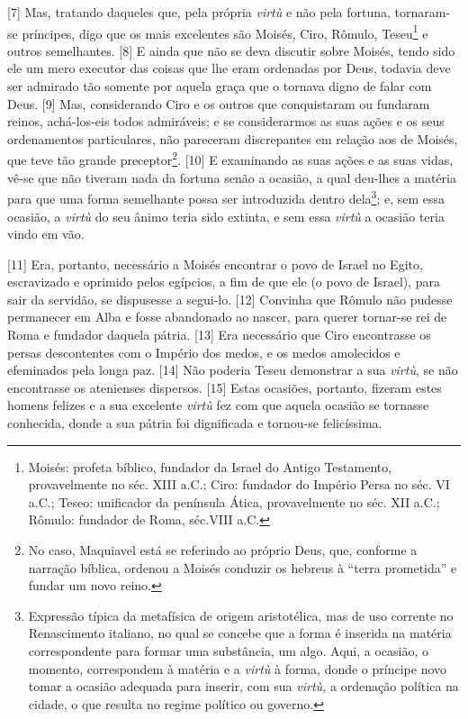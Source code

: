 {[}7{]} Mas, tratando daqueles que, pela própria \emph{virtù} e não pela
fortuna, tornaram- se príncipes, digo que os mais excelentes são Moisés,
Ciro, Rômulo, Teseu\footnote{Moisés: profeta bíblico, fundador da Israel
  do Antigo Testamento, provavelmente no séc. XIII a.C.; Ciro: fundador
  do Império Persa no séc. VI a.C.; Teseo: unificador da península
  Ática, provavelmente no séc. XII a.C.; Rômulo: fundador de Roma,
  séc.VIII a.C.} e outros semelhantes. {[}8{]} E ainda que não se deva
discutir sobre Moisés, tendo sido ele um mero executor das coisas que
lhe eram ordenadas por Deus, todavia deve ser admirado tão somente por
aquela graça que o tornava digno de falar com Deus. {[}9{]} Mas,
considerando Ciro e os outros que conquistaram ou fundaram reinos,
achá-los-eis todos admiráveis; e se considerarmos as suas ações e os
seus ordenamentos particulares, não pareceram discrepantes em relação
aos de Moisés, que teve tão grande preceptor\footnote{No caso, Maquiavel
  está se referindo ao próprio Deus, que, conforme a narração bíblica,
  ordenou a Moisés conduzir os hebreus à ``terra prometida'' e fundar um
  novo reino.}. {[}10{]} E examinando as suas ações e as suas vidas,
vê-se que não tiveram nada da fortuna senão a ocasião, a qual deu-lhes a
matéria para que uma forma semelhante possa ser introduzida dentro
dela\footnote{Expressão típica da metafísica de origem aristotélica, mas
  de uso corrente no Renascimento italiano, no qual se concebe que a
  forma é inserida na matéria correspondente para formar uma substância,
  um algo. Aqui, a ocasião, o momento, correspondem à matéria e a
  \emph{virtù} à forma, donde o príncipe novo tomar a ocasião adequada
  para inserir, com sua \emph{virtù,} a ordenação política na cidade, o
  que resulta no regime político ou governo.}; e, sem essa ocasião, a
\emph{virtù} do seu ânimo teria sido extinta, e sem essa \emph{virtù} a
ocasião teria vindo em vão.

{[}11{]} Era, portanto, necessário a Moisés encontrar o povo de Israel
no Egito, escravizado e oprimido pelos egípcios, a fim de que ele (o
povo de Israel), para sair da servidão, se dispusesse a segui-lo.
{[}12{]} Convinha que Rômulo não pudesse permanecer em Alba e fosse
abandonado ao nascer, para querer tornar-se rei de Roma e fundador
daquela pátria. {[}13{]} Era necessário que Ciro encontrasse os persas
descontentes com o Império dos medos, e os medos amolecidos e efeminados
pela longa paz. {[}14{]} Não poderia Teseu demonstrar a sua
\emph{virtù}, se não encontrasse os atenienses dispersos. {[}15{]} Estas
ocasiões, portanto, fizeram estes homens felizes e a sua excelente
\emph{virtù} fez com que aquela ocasião se tornasse conhecida, donde a
sua pátria foi dignificada e tornou-se felicíssima.

